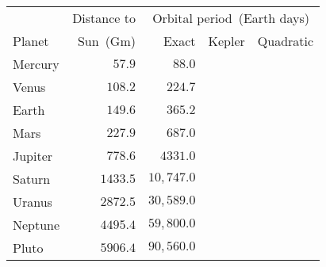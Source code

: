\begin{tabular}{lrrrr}                                                 \toprule
        & Distance to & \multicolumn{3}{c}{Orbital period~(Earth days)} \\
  \cmidrule{3-5}
Planet  & Sun~(Gm)    & Exact  & Kepler & Quadratic \\\midrule
Mercury & $57.9$               & $88.0$     \\[4pt]
Venus   & $108.2$              & $224.7$    \\[4pt]
Earth   & $149.6$              & $365.2$    \\[4pt]
Mars    & $227.9$              & $687.0$    \\[4pt]
Jupiter & $778.6$              & $4331.0$   \\[4pt]
Saturn  & $1433.5$             & $10,747.0$ \\[4pt]
Uranus  & $2872.5$             & $30,589.0$ \\[4pt]
Neptune & $4495.4$             & $59,800.0$ \\[4pt]
Pluto   & $5906.4$             & $90,560.0$ \\\bottomrule
\end{tabular}
